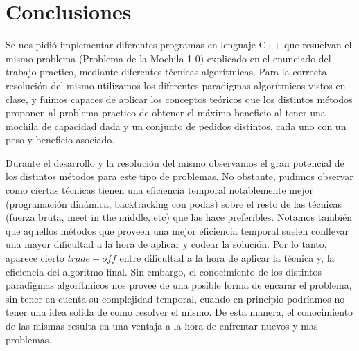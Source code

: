 \section{Conclusiones}
\label{sec:conclusiones}

Se nos pidió implementar diferentes programas en lenguaje C++ que resuelvan el mismo problema (Problema de la Mochila 1-0) explicado en el enunciado del trabajo practico, mediante diferentes técnicas algorítmicas.
Para la correcta resolución del mismo utilizamos los diferentes paradigmas algorítmicos vistos en clase, y fuimos capaces de aplicar los conceptos teóricos que los distintos métodos proponen al problema practico de obtener el máximo beneficio al tener una mochila de capacidad dada y un conjunto de pedidos distintos, cada uno con un peso y beneficio asociado.


Durante el desarrollo y la resolución del mismo observamos el gran potencial de los distintos métodos para este tipo de problemas. No obstante, pudimos observar como ciertas técnicas tienen una eficiencia temporal notablemente mejor (programación dinámica, backtracking con podas) sobre el resto de las técnicas (fuerza bruta, meet in the middle, etc) que las hace preferibles. Notamos también que aquellos métodos que proveen una mejor eficiencia temporal suelen conllevar una mayor dificultad a la hora de aplicar y codear la solución. Por lo tanto, aparece cierto $trade-off$ entre dificultad a la hora de aplicar la técnica y, la eficiencia del algoritmo final.
Sin embargo, el conocimiento de los distintos paradigmas algorítmicos nos provee de una posible forma de encarar el problema, sin tener en cuenta su complejidad temporal, cuando en principio podríamos no tener una idea solida de como resolver el mismo. De esta manera, el conocimiento de las mismas resulta en una ventaja a la hora de enfrentar nuevos y mas problemas.

